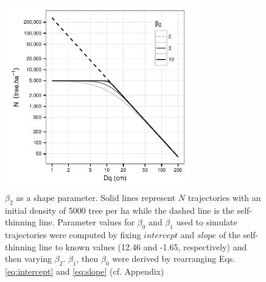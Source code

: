 \documentclass[12pt,english]{article}
\begin{document}
\newpage
\begin{figure}%
	\centering
	\includegraphics[width=8cm]{fig1.pdf}
	\caption{$\beta_2$ as a shape parameter. Solid lines represent $N$ trajectories with an initial density of 5000 tree per ha while the dashed line is the self-thinning line. Parameter values for $\beta_0$ and $\beta_1$ used to simulate trajectories were computed by fixing $intercept$ and $slope$ of the self-thinning line to known values (12.46 and -1.65, respectively) and then varying $\beta_2$. $\beta_1$, then  $\beta_0$ were derived by rearranging Eqs.\ref{eq:intercept} and \ref{eq:slope} (cf. Appendix)}
	\label{fig:fig1}
\end{figure}
\end{document}
